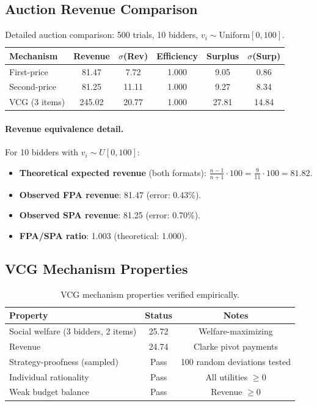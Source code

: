 \documentclass[10pt]{article}
\begin{document}
\subsection{Auction Revenue Comparison}

\begin{table}[H]
\centering
\caption{Detailed auction comparison: 500 trials, 10 bidders, $v_i \sim \mathrm{Uniform}[0,100]$.}
\label{tab:auctions-ext}
\begin{tabular}{lccccc}
\toprule
\textbf{Mechanism} & \textbf{Revenue} & \textbf{$\sigma$(Rev)} & \textbf{Efficiency} & \textbf{Surplus} & \textbf{$\sigma$(Surp)} \\
\midrule
First-price  & 81.47 & 7.72  & 1.000 & 9.05  & 0.86 \\
Second-price & 81.25 & 11.11 & 1.000 & 9.27  & 8.34 \\
VCG (3 items)& 245.02& 20.77 & 1.000 & 27.81 & 14.84 \\
\bottomrule
\end{tabular}
\end{table}

\paragraph{Revenue equivalence detail.}
For 10 bidders with $v_i \sim U[0,100]$:
\begin{itemize}
  \item \textbf{Theoretical expected revenue} (both formats): $\frac{n-1}{n+1} \cdot 100 = \frac{9}{11} \cdot 100 = 81.82$.
  \item \textbf{Observed FPA revenue}: 81.47 (error: 0.43\%).
  \item \textbf{Observed SPA revenue}: 81.25 (error: 0.70\%).
  \item \textbf{FPA/SPA ratio}: 1.003 (theoretical: 1.000).
\end{itemize}

\subsection{VCG Mechanism Properties}

\begin{table}[H]
\centering
\caption{VCG mechanism properties verified empirically.}
\label{tab:vcg-props}
\begin{tabular}{lcc}
\toprule
\textbf{Property} & \textbf{Status} & \textbf{Notes} \\
\midrule
Social welfare (3 bidders, 2 items) & 25.72 & Welfare-maximizing \\
Revenue & 24.74 & Clarke pivot payments \\
Strategy-proofness (sampled) & Pass & 100 random deviations tested \\
Individual rationality & Pass & All utilities $\geq 0$ \\
Weak budget balance & Pass & Revenue $\geq 0$ \\
\bottomrule
\end{tabular}
\end{table}
\end{document}

